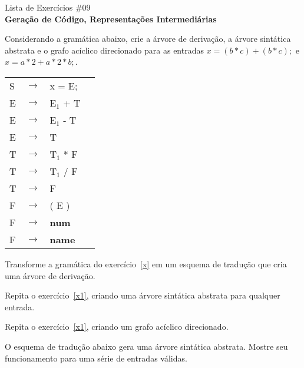 \documentclass{compiladores}
\begin{document}
\begin{center}
{\LARGE Lista de Exercícios \#09}\\
{\bf Geração de Código, Representações Intermediárias}
\end{center}

\bigskip

\begin{listanumerada}
\item \label{x} Considerando a gramática abaixo, crie a árvore de
  derivação, a árvore sintática abstrata e o grafo acíclico
  direcionado para as entradas $x=(b*c)+(b*c);$ e $x=a*2+a*2*b;$.

  \begin{tabular}{llll}
    S  &  $\rightarrow$  &  x = E;            \\
    E  &  $\rightarrow$  &  E$_1$ + T         \\
    E  &  $\rightarrow$  &  E$_1$ - T         \\
    E  &  $\rightarrow$  &  T                 \\
    T  &  $\rightarrow$  &  T$_1$ * F         \\
    T  &  $\rightarrow$  &  T$_1$ / F         \\
    T  &  $\rightarrow$  &  F                 \\
    F  &  $\rightarrow$  &  ( E )             \\
    F  &  $\rightarrow$  &  \textbf{num}    \\
    F  &  $\rightarrow$  &  \textbf{name}    \\
  \end{tabular}

\item \label{x1} Transforme a gramática do exercício~\ref{x} em um esquema de
  tradução que cria uma árvore de derivação.

\item Repita o exercício~\ref{x1}, criando uma árvore sintática
  abstrata para qualquer entrada.

\item \label{y} Repita o exercício~\ref{x1}, criando um grafo acíclico
  direcionado.

\item \label{t} O esquema de tradução abaixo gera uma árvore sintática
  abstrata. Mostre seu funcionamento para uma série de entradas
  válidas.


\end{listanumerada}
\end{document}
